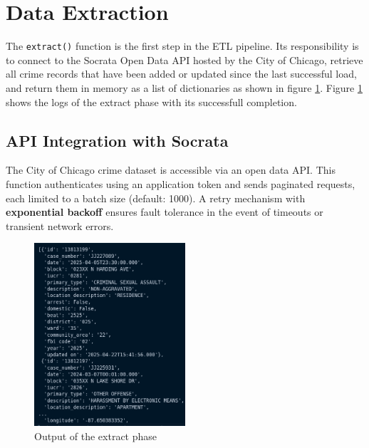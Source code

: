 \documentclass[12pt]{article}
\begin{document}
\section{Data Extraction}

The \texttt{extract()} function is the first step in the ETL pipeline. Its responsibility is to connect to the Socrata Open Data API hosted by the City of Chicago, retrieve all crime records that have been added or updated since the last successful load, and return them in memory as a list of dictionaries as shown in figure \ref{fig:extract_output}. Figure \ref{fig:extract_output} shows the logs of the extract phase with its successfull completion.

\subsection*{API Integration with Socrata}
The City of Chicago crime dataset is accessible via an open data API. This function authenticates using an application token and sends paginated requests, each limited to a batch size (default: 1000). A retry mechanism with \textbf{exponential backoff} ensures fault tolerance in the event of timeouts or transient network errors.



\begin{figure}[h!]
    \centering
    \includegraphics[width=0.5\textwidth]{figures/extract_output.png}
    \caption{Output of the extract phase}
    \label{fig:extract_output}
\end{figure}
\end{document}
